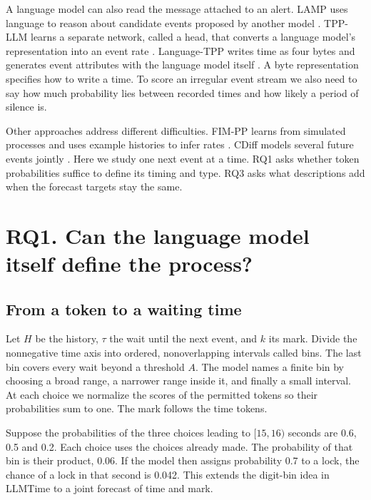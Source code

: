 \documentclass[sigconf,nonacm]{acmart}
\begin{document}
A language model can also read the message attached to an alert. LAMP uses language to reason about candidate events proposed by another model \cite{shi2023lamp}. TPP-LLM learns a separate network, called a head, that converts a language model's representation into an event rate \cite{liu2024tppllm}. Language-TPP writes time as four bytes and generates event attributes with the language model itself \cite{kong2026languagetpp}. A byte representation specifies how to write a time. To score an irregular event stream we also need to say how much probability lies between recorded times and how likely a period of silence is.

Other approaches address different difficulties. FIM-PP learns from simulated processes and uses example histories to infer rates \cite{berghaus2026fimpp}. CDiff models several future events jointly \cite{zeng2024cdiff}. Here we study one next event at a time. RQ1 asks whether token probabilities suffice to define its timing and type. RQ3 asks what descriptions add when the forecast targets stay the same.

\section{RQ1. Can the language model itself define the process?}
\subsection{From a token to a waiting time}
Let $H$ be the history, $\tau$ the wait until the next event, and $k$ its mark. Divide the nonnegative time axis into ordered, nonoverlapping intervals called bins. The last bin covers every wait beyond a threshold $A$. The model names a finite bin by choosing a broad range, a narrower range inside it, and finally a small interval. At each choice we normalize the scores of the permitted tokens so their probabilities sum to one. The mark follows the time tokens.

Suppose the probabilities of the three choices leading to $[15,16)$ seconds are 0.6, 0.5 and 0.2. Each choice uses the choices already made. The probability of that bin is their product, 0.06. If the model then assigns probability 0.7 to a lock, the chance of a lock in that second is 0.042. This extends the digit-bin idea in LLMTime \cite{gruver2023llmtime} to a joint forecast of time and mark.
\end{document}
